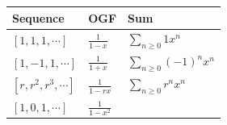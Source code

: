 \begin{longtable}[]{@{}lll@{}}
\toprule
\begin{minipage}[b]{0.30\columnwidth}\raggedright
Sequence\strut
\end{minipage} & \begin{minipage}[b]{0.30\columnwidth}\raggedright
OGF\strut
\end{minipage} & \begin{minipage}[b]{0.30\columnwidth}\raggedright
Sum\strut
\end{minipage}\tabularnewline
\midrule
\endhead
\begin{minipage}[t]{0.30\columnwidth}\raggedright
\([1, 1, 1, \cdots]\)\strut
\end{minipage} & \begin{minipage}[t]{0.30\columnwidth}\raggedright
\(\frac 1 {1-x}\)\strut
\end{minipage} & \begin{minipage}[t]{0.30\columnwidth}\raggedright
\(\displaystyle\sum_{n\geq 0}1x^n\)\strut
\end{minipage}\tabularnewline
\begin{minipage}[t]{0.30\columnwidth}\raggedright
\([1, -1, 1, \cdots]\)\strut
\end{minipage} & \begin{minipage}[t]{0.30\columnwidth}\raggedright
\(\frac 1 {1+x}\)\strut
\end{minipage} & \begin{minipage}[t]{0.30\columnwidth}\raggedright
\(\displaystyle\sum_{n\geq 0}(-1)^nx^n\)\strut
\end{minipage}\tabularnewline
\begin{minipage}[t]{0.30\columnwidth}\raggedright
\([r, r^2, r^3, \cdots]\)\strut
\end{minipage} & \begin{minipage}[t]{0.30\columnwidth}\raggedright
\(\frac 1 {1-rx}\)\strut
\end{minipage} & \begin{minipage}[t]{0.30\columnwidth}\raggedright
\(\displaystyle\sum_{n\geq 0}r^nx^n\)\strut
\end{minipage}\tabularnewline
\begin{minipage}[t]{0.30\columnwidth}\raggedright
\([1, 0, 1, \cdots]\)\strut
\end{minipage} & \begin{minipage}[t]{0.30\columnwidth}\raggedright
\(\frac 1 {1-x^2}\)\strut
\end{minipage} & \begin{minipage}[t]{0.30\columnwidth}\raggedright

\end{minipage}
\end{longtable}
